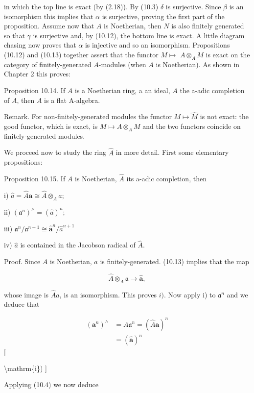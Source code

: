 \documentclass{standalone}
\theoremstyle{definition}
\theoremstyle{remark}
\begin{document}
in which the top line is exact (by (2.18)). By (10.3) $\delta$ is surjective. Since $\beta$ is an isomorphism this implies that $\alpha$ is surjective, proving the first part of the proposition. Assume now that $A$ is Noetherian, then $N$ is also finitely generated so that $\gamma$ is surjective and, by (10.12), the bottom line is exact. A little diagram chasing now proves that $\alpha$ is injective and so an isomorphism. Propositions (10.12) and (10.13) together assert that the functor $M \mapsto$ $A \otimes_{A} M$ is exact on the category of finitely-generated $A$-modules (when $A$ is Noetherian). As shown in Chapter 2 this proves:

Proposition 10.14. If $A$ is a Noetherian ring, a an ideal, $A$ the a-adic completion of $A$, then $A$ is a flat A-algebra.

Remark. For non-finitely-generated modules the functor $M \mapsto \hat{M}$ is not exact: the good functor, which is exact, is $M \mapsto A \otimes_{A} M$ and the two functors coincide on finitely-generated modules.

We proceed now to study the ring $\hat{A}$ in more detail. First some elementary propositions:

Proposition 10.15. If $A$ is Noetherian, $\hat{A}$ its a-adic completion, then

i) $\hat{a}=\hat{A} \mathbf{a} \cong \hat{A} \otimes_{A} a$;

ii) $\left(\mathfrak{a}^{n}\right)^{\wedge}=(\hat{a})^{n}$;

iii) $\mathfrak{a}^{n} / \mathfrak{a}^{n+1} \cong \hat{\mathbf{a}}^{n} / \hat{a}^{n+1}$

iv) $\hat{a}$ is contained in the Jacobson radical of $\hat{A}$.

Proof. Since $A$ is Noetherian, $a$ is finitely-generated. (10.13) implies that the map

\[
\hat{A} \otimes_{A} \mathfrak{a} \rightarrow \hat{\mathbf{a}},
\]

whose image is $\hat{A} a$, is an isomorphism. This proves $i)$. Now apply i) to $\mathfrak{a}^{n}$ and we deduce that

\[
\begin{aligned}
\left(\mathbf{a}^{n}\right)^{\wedge} & =A \mathfrak{a}^{n}=(\hat{A} \mathbf{a})^{n} \\
& =(\hat{\mathbf{a}})^{n}
\end{aligned}
\][

 \textbackslash mathrm\{i\}) 
]

Applying (10.4) we now deduce
\end{document}
